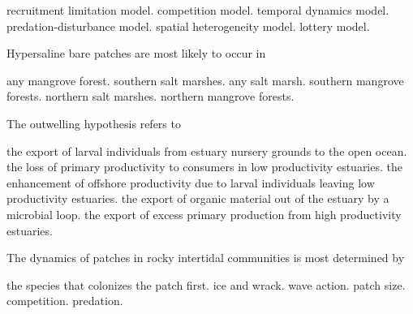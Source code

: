 \begin{choices}
\choice recruitment limitation model. 
\choice competition model. 
\choice temporal dynamics model. 
\choice predation-disturbance model. 
\choice spatial heterogeneity model. 
\correctchoice lottery model. 
\end{choices}

\question
Hypersaline bare patches are most likely to occur in

\begin{choices}
\choice any mangrove forest. 
\choice southern salt marshes. 
\choice any salt marsh. 
\choice southern mangrove forests. 
\correctchoice northern salt marshes. 
\choice northern mangrove forests. 
\end{choices}

\question
The outwelling hypothesis refers to

\begin{choices}
\choice the export of larval individuals from estuary nursery grounds to the open ocean.
\choice the loss of primary productivity to consumers in low productivity estuaries.
\choice the enhancement of offshore productivity due to larval individuals leaving low productivity estuaries.
\choice the export of organic material out of the estuary by a microbial loop.
\correctchoice the export of excess primary production from high productivity estuaries. 
\end{choices}

\question
The dynamics of patches in rocky intertidal communities is most determined by

\begin{choices}
\choice the species that colonizes the patch first. 
\choice ice and wrack. 
\choice wave action. 
\correctchoice patch size. 
\choice competition. 
\choice predation. 
\end{choices}
